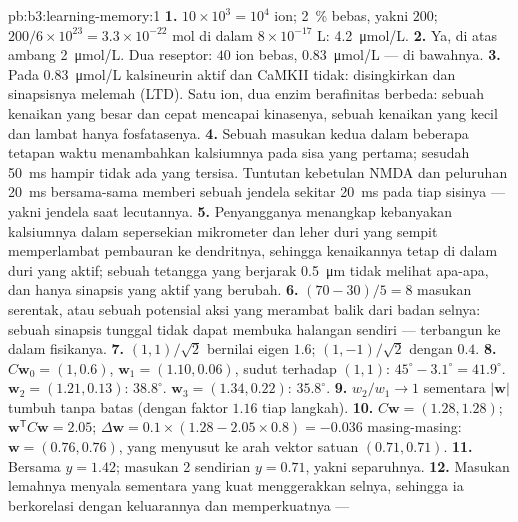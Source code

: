 \begin{solution}{pb:b3:learning-memory:1}
\textbf{1.} $10\times 10^{3} = 10^{4}$ ion; \qty{2}{\%} bebas, yakni $200$;
$200/6\times 10^{23} = 3.3\times 10^{-22}$ mol di dalam $8\times 10^{-17}$ L:
\qty{4.2}{\micro mol/L}.
\textbf{2.} Ya, di atas ambang \qty{2}{\micro mol/L}. Dua
reseptor: $40$ ion bebas, \qty{0.83}{\micro mol/L} --- di bawahnya.
\textbf{3.} Pada \qty{0.83}{\micro mol/L} kalsineurin aktif dan CaMKII
tidak:  disingkirkan dan sinapsisnya melemah (LTD). Satu
ion, dua enzim berafinitas berbeda: sebuah kenaikan yang besar dan cepat mencapai
kinasenya, sebuah kenaikan yang kecil dan lambat hanya fosfatasenya.
\textbf{4.} Sebuah masukan kedua dalam beberapa tetapan waktu menambahkan kalsiumnya
pada sisa yang pertama; sesudah \qty{50}{ms} hampir tidak ada yang
tersisa. Tuntutan kebetulan NMDA dan peluruhan \qty{20}{ms}
bersama-sama memberi sebuah jendela sekitar \qty{20}{ms} pada tiap sisinya --- yakni
jendela saat lecutannya.
\textbf{5.} Penyangganya menangkap kebanyakan kalsiumnya dalam sepersekian
mikrometer dan leher duri yang sempit memperlambat pembauran ke dendritnya,
sehingga kenaikannya tetap di dalam duri yang aktif; sebuah tetangga yang
berjarak \qty{0.5}{\micro m} tidak melihat apa-apa, dan hanya sinapsis yang aktif yang
berubah.
\textbf{6.} $(70 - 30)/5 = 8$ masukan serentak, atau sebuah potensial aksi
yang merambat balik dari badan selnya: sebuah sinapsis tunggal tidak dapat membuka halangan
 sendiri ---  terbangun ke dalam fisikanya.
\textbf{7.} $(1,1)/\sqrt{2}$ bernilai eigen $1.6$; $(1,-1)/\sqrt{2}$
dengan $0.4$.
\textbf{8.} $C\mathbf{w}_{0} = (1, 0.6)$, $\mathbf{w}_{1} = (1.10,
0.06)$, sudut terhadap $(1,1)$: $45^{\circ} - 3.1^{\circ} = 41.9^{\circ}$.
$\mathbf{w}_{2} = (1.21, 0.13)$: $38.8^{\circ}$. $\mathbf{w}_{3} = (1.34,
0.22)$: $35.8^{\circ}$.
\textbf{9.} $w_{2}/w_{1} \to 1$ sementara $|\mathbf{w}|$ tumbuh tanpa batas
(dengan faktor $1.16$ tiap langkah).
\textbf{10.} $C\mathbf{w} = (1.28, 1.28)$; $\mathbf{w}^{\mathsf{T}}C
\mathbf{w} = 2.05$; $\Delta\mathbf{w} = 0.1\times(1.28 - 2.05\times 0.8)
= -0.036$ masing-masing: $\mathbf{w} = (0.76, 0.76)$, yang menyusut ke arah vektor
satuan $(0.71, 0.71)$.
\textbf{11.} Bersama $y = 1.42$; masukan 2 sendirian $y = 0.71$, yakni separuhnya.
\textbf{12.} Masukan lemahnya menyala sementara yang kuat menggerakkan selnya,
sehingga ia berkorelasi dengan keluarannya dan  memperkuatnya ---

\end{solution}
